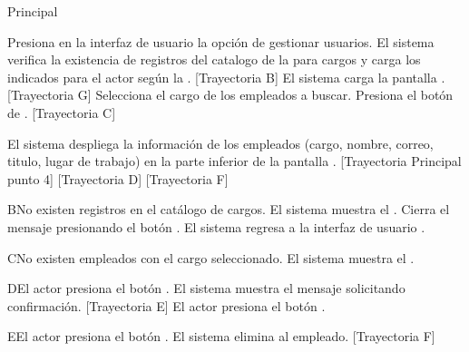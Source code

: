 \begin{UCtrayectoria}{Principal}
	
	\UCpaso[\UCactor] Presiona en la interfaz de usuario  la opción de gestionar usuarios. 
	\UCpaso  El sistema verifica la existencia de registros del catalogo de la  para cargos  y carga los indicados para el actor según la  . [Trayectoria B] 
	\UCpaso El sistema carga la pantalla  . [Trayectoria G] 
	\UCpaso[\UCactor] Selecciona el cargo de los empleados a buscar. 
	\UCpaso[\UCactor]  Presiona el botón de .  [Trayectoria C] 
	
	\UCpaso El sistema despliega la información de los empleados (cargo, nombre, correo, titulo, lugar de trabajo) en la parte inferior de la pantalla . [Trayectoria Principal punto 4] [Trayectoria D] [Trayectoria F] 
\end{UCtrayectoria}

\begin{UCtrayectoriaA}{B}{No existen registros en el catálogo de cargos.}
	\UCpaso     El sistema muestra el .
	\UCpaso[\UCactor] Cierra el mensaje presionando el botón .
	\UCpaso El sistema regresa a la interfaz de usuario .
\end{UCtrayectoriaA}

\begin{UCtrayectoriaA}{C}{No existen  empleados con el cargo seleccionado.}
	\UCpaso     El sistema muestra el .
\end{UCtrayectoriaA}


\begin{UCtrayectoriaA}{D}{El actor presiona el botón .}
	\UCpaso El sistema muestra el mensaje  solicitando confirmación. [Trayectoria E]
	\UCpaso[\UCactor] El actor presiona el botón .
\end{UCtrayectoriaA}

\begin{UCtrayectoriaA}{E}{El actor presiona el botón .}
	\UCpaso     El sistema elimina al empleado. [Trayectoria F]   
\end{UCtrayectoriaA}

